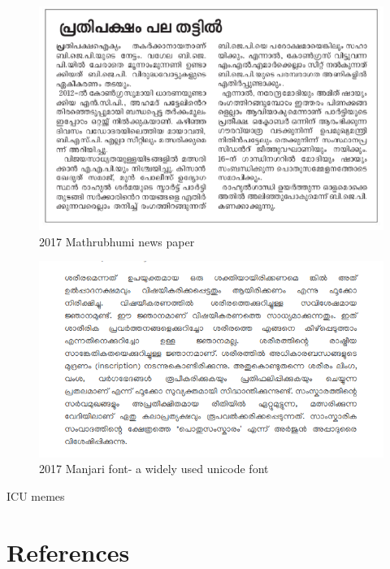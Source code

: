 \documentclass[10pt]{article}
\begin{document}
\begin{figure}
  \centering
   \includegraphics[width=1.0\textwidth]{images/2017-Mathrubhumi-newspaper.png}
     \caption{2017 Mathrubhumi news paper}
\end{figure}


\begin{figure}
  \centering
   \includegraphics[width=1.0\textwidth]{images/Manjari-Body-Text.png}
     \caption{2017 Manjari font- a widely used unicode font}
\end{figure}

ICU memes

\section{References}
\end{document}

